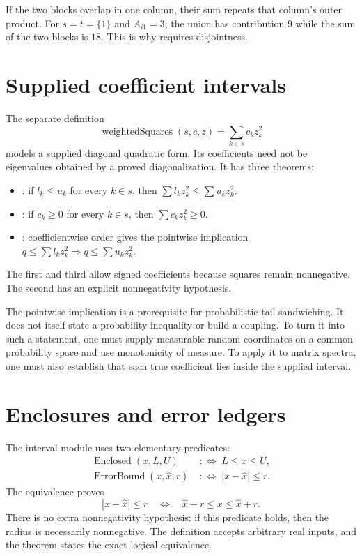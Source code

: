 If the two blocks overlap in one column, their sum repeats that column's
outer product. For $s=t=\{1\}$ and $A_{i1}=3$, the union has contribution $9$
while the sum of the two blocks is $18$. This is why
 requires disjointness.

\section{Supplied coefficient intervals}

The separate definition
\[
 \operatorname{weightedSquares}(s,c,z)=\sum_{k\in s}c_k z_k^2
\]
models a supplied diagonal quadratic form. Its coefficients need not be
eigenvalues obtained by a proved diagonalization. It has three theorems:
\begin{itemize}
 \item {}: if $l_k\le u_k$ for every $k\in s$, then
 $\sum l_kz_k^2\le\sum u_kz_k^2$.
 \item {}: if $c_k\ge0$ for every $k\in s$, then
 $\sum c_kz_k^2\ge0$.
 \item {}: coefficientwise order gives the
 pointwise implication $q\le\sum l_kz_k^2\Rightarrow q\le\sum u_kz_k^2$.
\end{itemize}
The first and third allow signed coefficients because squares remain
nonnegative. The second has an explicit nonnegativity hypothesis.

The pointwise implication is a prerequisite for probabilistic tail
sandwiching. It does not itself state a probability inequality or build a
coupling. To turn it into such a statement, one must supply measurable random
coordinates on a common probability space and use monotonicity of measure.
To apply it to matrix spectra, one must also establish that each true
coefficient lies inside the supplied interval.

\section{Enclosures and error ledgers}

The interval module uses two elementary predicates:
\begin{align*}
 \operatorname{Enclosed}(x,L,U)&\;:\Longleftrightarrow\;L\le x\le U,\\
 \operatorname{ErrorBound}(x,\widehat x,r)&\;:\Longleftrightarrow\;
 |x-\widehat x|\le r.
\end{align*}
The equivalence  proves
\[
 |x-\widehat x|\le r
 \quad\Longleftrightarrow\quad
 \widehat x-r\le x\le\widehat x+r.
\]
There is no extra nonnegativity hypothesis: if this predicate holds, then the
radius is necessarily nonnegative. The definition accepts arbitrary real
inputs, and the theorem states the exact logical equivalence.


